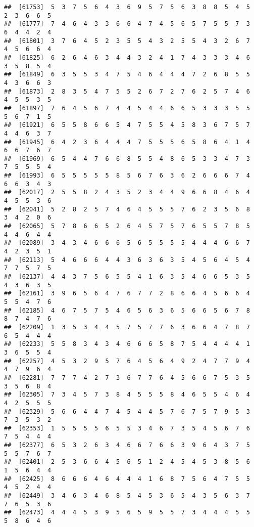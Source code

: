 \documentclass[
]{book}
\begin{document}
\begin{verbatim}
##  [61753]  5  3  7  5  6  4  3  6  9  5  7  5  6  3  8  8  5  4  5  2  3  6  6  5
##  [61777]  7  4  6  4  3  3  6  6  4  7  4  5  6  5  7  5  5  7  3  6  4  4  2  4
##  [61801]  3  7  6  4  5  2  3  5  5  4  3  2  5  5  4  3  2  6  7  4  5  6  6  4
##  [61825]  6  2  6  4  6  3  4  4  3  2  4  1  7  4  3  3  3  4  6  3  5  8  5  4
##  [61849]  6  3  5  5  3  4  7  5  4  6  4  4  4  7  2  6  8  5  5  4  3  6  6  3
##  [61873]  2  8  3  5  4  7  5  5  2  6  7  2  7  6  2  5  7  4  6  4  5  5  3  5
##  [61897]  7  6  4  5  6  7  4  4  5  4  4  6  6  5  3  3  3  5  5  5  6  7  1  5
##  [61921]  6  5  5  8  6  6  5  4  7  5  5  4  5  8  3  6  7  5  7  4  4  6  3  7
##  [61945]  6  4  2  3  6  4  4  4  7  5  5  5  6  5  8  6  4  1  4  6  6  7  6  7
##  [61969]  6  5  4  4  7  6  6  8  5  5  4  8  6  5  3  3  4  7  3  7  5  5  5  4
##  [61993]  6  5  5  5  5  5  8  5  6  7  6  3  6  2  6  6  6  7  4  6  6  3  4  3
##  [62017]  2  5  5  8  2  4  3  5  2  3  4  4  9  6  6  8  4  6  4  4  5  5  3  6
##  [62041]  5  2  8  2  5  7  4  6  4  5  5  5  7  6  2  3  5  6  8  3  4  2  0  6
##  [62065]  5  7  8  6  6  5  2  6  4  5  7  5  7  6  5  5  7  8  5  4  4  6  4  4
##  [62089]  3  4  3  4  6  6  6  5  6  5  5  5  5  4  4  4  6  6  7  4  2  3  5  1
##  [62113]  5  4  6  6  6  4  4  3  6  3  6  3  5  4  5  6  4  5  4  7  7  5  7  5
##  [62137]  4  4  3  7  5  6  5  5  4  1  6  3  5  4  6  6  5  3  5  4  3  6  3  5
##  [62161]  3  9  6  5  6  4  7  6  7  7  2  8  6  6  4  5  6  6  4  5  5  4  7  6
##  [62185]  4  6  7  5  7  5  4  6  5  6  3  6  5  6  6  5  6  7  8  8  7  4  7  6
##  [62209]  1  3  5  3  4  4  5  7  5  7  7  6  3  6  6  4  7  8  7  6  5  4  4  4
##  [62233]  5  5  8  3  4  3  4  6  6  6  5  8  7  5  4  4  4  4  1  3  6  5  5  4
##  [62257]  4  5  3  2  9  5  7  6  4  5  6  4  9  2  4  7  7  9  4  4  7  9  6  4
##  [62281]  7  7  7  4  2  7  3  6  7  7  6  4  5  6  6  7  5  3  5  3  5  6  8  4
##  [62305]  7  3  4  5  7  3  8  4  5  5  5  8  4  6  5  5  4  6  4  4  2  5  5  5
##  [62329]  5  6  6  4  4  7  4  5  4  4  5  7  6  7  5  7  9  5  3  7  3  5  3  2
##  [62353]  1  5  5  5  5  6  5  5  3  4  6  7  3  5  4  5  6  7  6  7  5  4  4  4
##  [62377]  6  5  3  2  6  3  4  6  6  7  6  6  3  9  6  4  3  7  5  5  5  7  6  7
##  [62401]  2  5  3  6  6  4  5  6  5  1  2  4  5  4  5  3  8  5  6  1  5  6  4  4
##  [62425]  8  6  6  6  4  6  4  4  4  1  6  8  7  5  6  4  7  5  5  4  5  2  4  4
##  [62449]  3  4  6  3  4  6  8  5  4  5  3  6  5  4  3  5  6  3  7  7  6  5  3  6
##  [62473]  4  4  4  5  3  9  5  6  5  9  5  5  7  3  4  4  4  5  5  5  8  6  4  6

\end{verbatim}
\end{document}
